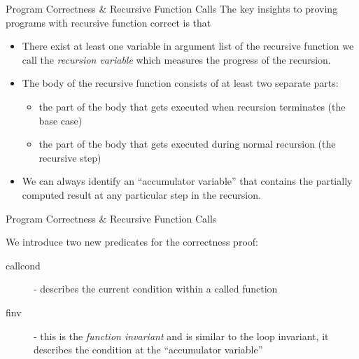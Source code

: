 \documentclass{beamer}
\begin{document}
\begin{frame}[fragile]{Program Correctness \& Recursive Function Calls}
\small
The key insights to proving programs with recursive function correct is that 
\begin{itemize}
\item
There exist at least one
variable in argument list of the recursive function 
we call the {\em recursion variable} which measures the progress of
the recursion.

\item
The body of the recursive function consists of at least two separate parts:
\begin{itemize}
\item the part of the body that gets executed when recursion terminates (the base case)
\item the part of the body that gets executed during normal recursion (the recursive step)
\end{itemize}

\item
We can always identify an ``accumulator variable'' that contains the partially computed result at
any particular step in the recursion.
\end{itemize}
\end{frame}

\begin{frame}[fragile]{Program Correctness \& Recursive Function Calls}

We introduce two new predicates for the correctness proof:
\begin{description}
\item[callcond] - describes the current condition within a called function
\item[finv] - this is the {\em function invariant} and is similar to the loop invariant,
it describes the condition at the ``accumulator variable''
\end{description}
\end{frame}
\end{document}
